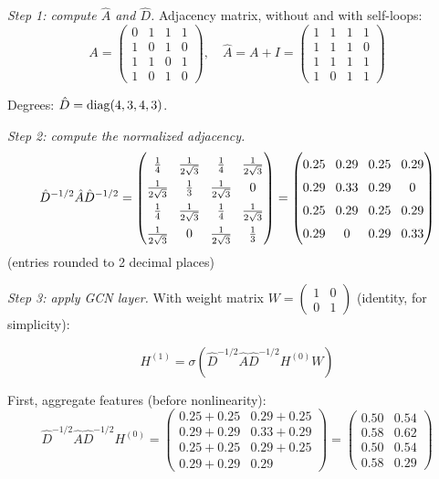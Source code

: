 \begin{notechapter}
\begin{example}
\emph{Step 1: compute $\hat{A}$ and $\hat{D}$.}
Adjacency matrix, without and with self-loops:
\[
A = \begin{pmatrix}
0 & 1 & 1 & 1 \\
1 & 0 & 1 & 0 \\
1 & 1 & 0 & 1 \\
1 & 0 & 1 & 0
\end{pmatrix}, \quad
\hat{A} = A + I = \begin{pmatrix}
1 & 1 & 1 & 1 \\
1 & 1 & 1 & 0 \\
1 & 1 & 1 & 1 \\
1 & 0 & 1 & 1
\end{pmatrix}
\]

Degrees: $\hat{D} = \operatorname{diag}(4, 3, 4, 3)$.

\emph{Step 2: compute the normalized adjacency.}
\[
\hat{D}^{-1/2} \hat{A} \hat{D}^{-1/2} =
{
\renewcommand{\arraystretch}{1.5} %
\setlength{\arraycolsep}{4pt}    %
\begin{pmatrix}
\frac{1}{4} & \frac{1}{2\sqrt{3}} & \frac{1}{4} & \frac{1}{2\sqrt{3}} \\
\frac{1}{2\sqrt{3}} & \frac{1}{3} & \frac{1}{2\sqrt{3}} & 0 \\
\frac{1}{4} & \frac{1}{2\sqrt{3}} & \frac{1}{4} & \frac{1}{2\sqrt{3}} \\
\frac{1}{2\sqrt{3}} & 0 & \frac{1}{2\sqrt{3}} & \frac{1}{3}
\end{pmatrix}
=
\begin{pmatrix}
0.25 & 0.29 & 0.25 & 0.29 \\
0.29 & 0.33 & 0.29 & 0 \\
0.25 & 0.29 & 0.25 & 0.29 \\
0.29 & 0 & 0.29 & 0.33
\end{pmatrix}
}
\]
(entries rounded to 2 decimal places)

\emph{Step 3: apply GCN layer.} With weight matrix
$W = \begin{pmatrix} 1 & 0 \\ 0 & 1 \end{pmatrix}$ (identity, for simplicity):

\[
H^{(1)} = \sigma\left( \hat{D}^{-1/2} \hat{A} \hat{D}^{-1/2} H^{(0)} W \right)
\]

First, aggregate features (before nonlinearity):
\[
\hat{D}^{-1/2} \hat{A} \hat{D}^{-1/2} H^{(0)} =
\begin{pmatrix}
0.25 + 0.25 & 0.29 + 0.25 \\
0.29 + 0.29 & 0.33 + 0.29 \\
0.25 + 0.25 & 0.29 + 0.25 \\
0.29 + 0.29 & 0.29
\end{pmatrix}
= \begin{pmatrix}
0.50 & 0.54 \\
0.58 & 0.62 \\
0.50 & 0.54 \\
0.58 & 0.29
\end{pmatrix}
\]


\end{example}
\end{notechapter}
